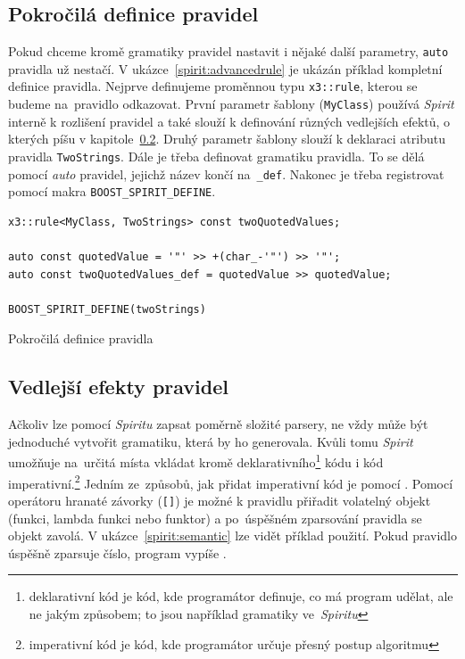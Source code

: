 \documentclass[thesis=B,czech,hidelinks]{FITthesis}[2019/03/06]
\begin{document}
\subsection{Pokročilá definice pravidel}\label{advanced:rules}
Pokud chceme kromě gramatiky pravidel nastavit i nějaké další parametry, \texttt{auto} pravidla už nestačí. V ukázce~\ref{spirit:advancedrule} je ukázán příklad kompletní definice pravidla. Nejprve definujeme proměnnou typu \texttt{x3::rule}, kterou se budeme na~pravidlo odkazovat. První parametr šablony (\texttt{MyClass}) používá \textit{Spirit} interně k rozlišení pravidel a také slouží k definování různých vedlejších efektů, o kterých píšu v kapitole~\ref{sideeffects}. Druhý parametr šablony slouží k deklaraci atributu pravidla \texttt{TwoStrings}. Dále je třeba definovat gramatiku pravidla. To se dělá pomocí \textit{auto} pravidel, jejichž název končí na~\verb¨_def¨. Nakonec je třeba registrovat pomocí makra \verb¨BOOST_SPIRIT_DEFINE¨.

\begin{listing}
\begin{verbatim}
x3::rule<MyClass, TwoStrings> const twoQuotedValues;

auto const quotedValue = '"' >> +(char_-'"') >> '"';
auto const twoQuotedValues_def = quotedValue >> quotedValue;

BOOST_SPIRIT_DEFINE(twoStrings)
\end{verbatim}
\caption{Pokročilá definice pravidla}\label{spirit:advancedrule}
\end{listing}

\subsection{Vedlejší efekty pravidel}\label{sideeffects}
Ačkoliv lze pomocí \textit{Spiritu} zapsat poměrně složité parsery, ne vždy může být jednoduché vytvořit gramatiku, která by ho generovala. Kvůli tomu \textit{Spirit} umožňuje na~určitá místa vkládat kromě deklarativního\footnote{deklarativní kód je kód, kde programátor definuje, co má program udělat, ale ne jakým způsobem; to jsou například gramatiky ve~\textit{Spiritu}} kódu i kód imperativní.\footnote{imperativní kód je kód, kde programátor určuje přesný postup algoritmu} Jedním ze~způsobů, jak přidat imperativní kód je pomocí . Pomocí operátoru hranaté závorky (\verb¨[]¨) je možné k pravidlu přiřadit volatelný objekt (funkci, lambda funkci nebo funktor) a po~úspěšném zparsování pravidla se objekt zavolá. V ukázce~\ref{spirit:semantic} lze vidět příklad použití. Pokud pravidlo úspěšně zparsuje číslo, program vypíše .
\end{document}
